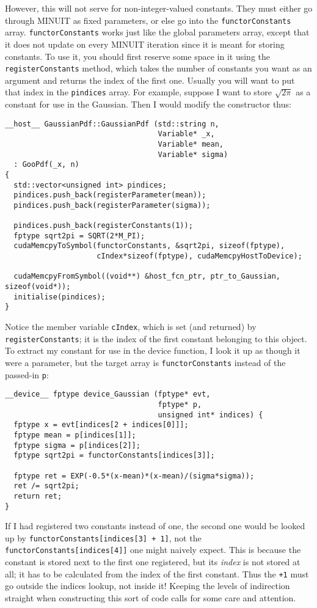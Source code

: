 \documentclass[12pt,pdflatex]{article}
\begin{document}
However, this will not serve for non-integer-valued constants. They must either
go through MINUIT as fixed parameters, or else go into the \texttt{functorConstants}
array. \verb|functorConstants| works just like the global parameters
array, except that it does not update on every MINUIT iteration since
it is meant for storing constants. To use it, you should first reserve
some space in it using the \verb|registerConstants| method, which takes
the number of constants you want as an argument and returns the index
of the first one. Usually you will want to put that index in the \verb|pindices|
array. For example, suppose I want to store $\sqrt{2\pi}$ as a constant
for use in the Gaussian. Then I would modify the constructor thus:
\begin{verbatim}
__host__ GaussianPdf::GaussianPdf (std::string n, 
                                   Variable* _x, 
                                   Variable* mean, 
                                   Variable* sigma) 
  : GooPdf(_x, n) 
{
  std::vector<unsigned int> pindices;
  pindices.push_back(registerParameter(mean));
  pindices.push_back(registerParameter(sigma));

  pindices.push_back(registerConstants(1)); 
  fptype sqrt2pi = SQRT(2*M_PI);
  cudaMemcpyToSymbol(functorConstants, &sqrt2pi, sizeof(fptype), 
                     cIndex*sizeof(fptype), cudaMemcpyHostToDevice); 

  cudaMemcpyFromSymbol((void**) &host_fcn_ptr, ptr_to_Gaussian, sizeof(void*));
  initialise(pindices); 
}
\end{verbatim}
Notice the member variable \verb|cIndex|, which is set (and returned) by \verb|registerConstants|; it is the
index of the first constant belonging to this object. To extract my constant for
use in the device function, I look it up as though it were a parameter, but the
target array is \verb|functorConstants| instead of the passed-in \verb|p|:
\begin{verbatim}
__device__ fptype device_Gaussian (fptype* evt, 
                                   fptype* p, 
                                   unsigned int* indices) {
  fptype x = evt[indices[2 + indices[0]]]; 
  fptype mean = p[indices[1]];
  fptype sigma = p[indices[2]];
  fptype sqrt2pi = functorConstants[indices[3]];

  fptype ret = EXP(-0.5*(x-mean)*(x-mean)/(sigma*sigma));
  ret /= sqrt2pi; 
  return ret; 
}
\end{verbatim}

If I had registered two constants instead of one, the second one would be looked
up by \verb|functorConstants[indices[3] + 1]|, not the \texttt{functorConstants[indices[4]]}
one might naively expect. This is because the constant is stored next to the first one
registered, but its \emph{index} is not stored at all; it has to be calculated from the
index of the first constant. Thus the \verb|+1| must go outside the indices lookup,
not inside it! Keeping the levels of indirection
straight when constructing this sort of code calls for some care and attention. 
\end{document}
